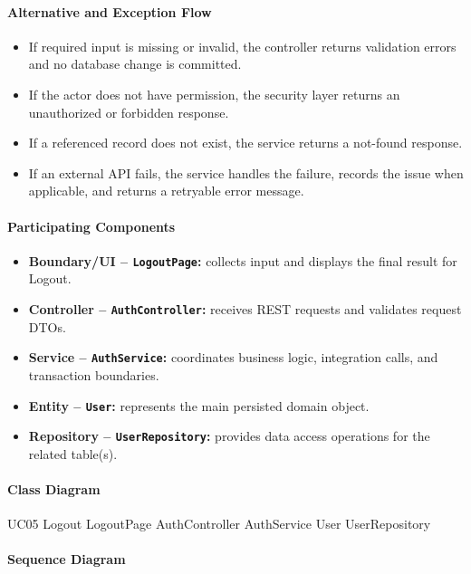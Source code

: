 \paragraph{Alternative and Exception Flow}

\begin{itemize}
    \item If required input is missing or invalid, the controller returns validation errors and no database change is committed.
    \item If the actor does not have permission, the security layer returns an unauthorized or forbidden response.
    \item If a referenced record does not exist, the service returns a not-found response.
    \item If an external API fails, the service handles the failure, records the issue when applicable, and returns a retryable error message.
\end{itemize}

\paragraph{Participating Components}

\begin{itemize}
    \item \textbf{Boundary/UI -- \texttt{LogoutPage}:} collects input and displays the final result for Logout.
    \item \textbf{Controller -- \texttt{AuthController}:} receives REST requests and validates request DTOs.
    \item \textbf{Service -- \texttt{AuthService}:} coordinates business logic, integration calls, and transaction boundaries.
    \item \textbf{Entity -- \texttt{User}:} represents the main persisted domain object.
    \item \textbf{Repository -- \texttt{UserRepository}:} provides data access operations for the related table(s).
\end{itemize}

\paragraph{Class Diagram}

\ClassDiagram
{UC05 Logout}
{LogoutPage}
{AuthController}
{AuthService}
{User}
{UserRepository}

\paragraph{Sequence Diagram}

